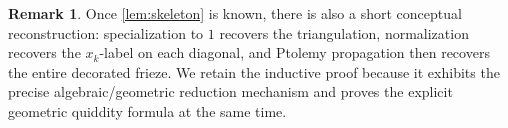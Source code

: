 \documentclass[amstex,11pt,reqno]{amsart}
\theoremstyle{definition}
\newtheorem{remark}[theorem]{Remark}
\begin{document}
\begin{remark}\label{rem:conceptual}
Once \cref{lem:skeleton} is known, there is also a short conceptual reconstruction: specialization to $1$ recovers the triangulation, normalization recovers the $x_k$-label on each diagonal, and Ptolemy propagation then recovers the entire decorated frieze. We retain the inductive proof because it exhibits the precise algebraic/geometric reduction mechanism and proves the explicit geometric quiddity formula at the same time.
\end{remark}

%
%
\end{document}
